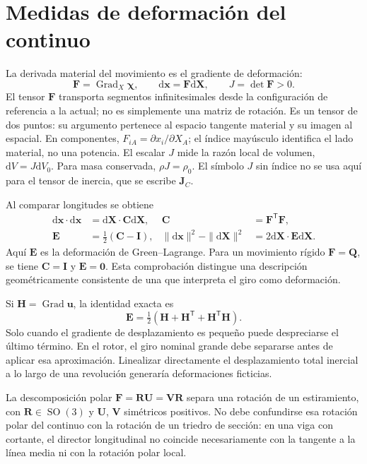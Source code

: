 \documentclass[11pt,a4paper,oneside]{report}
\newcommand{\vct}[1]{\bm{#1}}
\newcommand{\ten}[1]{\boldsymbol{#1}}
\newcommand{\dd}{\mathrm d}
\newcommand{\Id}{\mathbf I}
\newcommand{\tr}{\mathsf T}
\newcommand{\Grad}{\operatorname{Grad}}
\newcommand{\SO}{\operatorname{SO}(3)}
\begin{document}
\section{Medidas de deformación del continuo}
La derivada material del movimiento es el gradiente de deformación:
\begin{equation}
 \ten F=\Grad_{\!X}\vct\chi,
 \qquad \dd\vct x=\ten F\dd\vct X,
 \qquad J=\det\ten F>0.
\end{equation}
El tensor $\ten F$ transporta segmentos infinitesimales desde la configuración de referencia a la actual; no es simplemente una matriz de rotación. Es un tensor de dos puntos: su argumento pertenece al espacio tangente material y su imagen al espacial. En componentes, $F_{iA}=\partial x_i/\partial X_A$; el índice mayúsculo identifica el lado material, no una potencia. El escalar $J$ mide la razón local de volumen, $\dd V=J\dd V_0$. Para masa conservada, $\rho J=\rho_0$. El símbolo $J$ sin índice no se usa aquí para el tensor de inercia, que se escribe $\ten J_C$.

Al comparar longitudes se obtiene
\begin{align}
 \dd\vct x\cdot\dd\vct x&=\dd\vct X\cdot\ten C\dd\vct X,
 &\ten C&=\ten F^\tr\ten F,\\
 \ten E&=\tfrac12(\ten C-\Id),
 &\|\dd\vct x\|^2-\|\dd\vct X\|^2&=2\dd\vct X\cdot\ten E\dd\vct X.
\end{align}
Aquí $\ten E$ es la deformación de Green--Lagrange. Para un movimiento rígido $\ten F=\ten Q$, se tiene $\ten C=\Id$ y $\ten E=\ten0$. Esta comprobación distingue una descripción geométricamente consistente de una que interpreta el giro como deformación.

Si $\ten H=\Grad\vct u$, la identidad exacta es
\begin{equation}
 \ten E=\tfrac12(\ten H+\ten H^\tr+\ten H^\tr\ten H).
\end{equation}
Solo cuando el gradiente de desplazamiento es pequeño puede despreciarse el último término. En el rotor, el giro nominal grande debe separarse antes de aplicar esa aproximación. Linealizar directamente el desplazamiento total inercial a lo largo de una revolución generaría deformaciones ficticias.

La descomposición polar $\ten F=\ten R\ten U=\ten V\ten R$ separa una rotación de un estiramiento, con $\ten R\in\SO$ y $\ten U$, $\ten V$ simétricos positivos. No debe confundirse esa rotación polar del continuo con la rotación de un triedro de sección: en una viga con cortante, el director longitudinal no coincide necesariamente con la tangente a la línea media ni con la rotación polar local.
\end{document}
